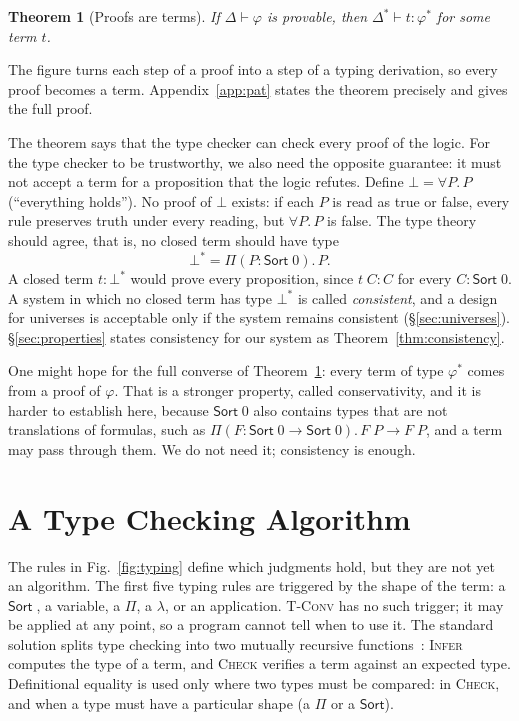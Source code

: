 \documentclass[acmsmall,screen,nonacm]{acmart}
\newtheorem{theorem}{Theorem}
\newcommand{\Sort}[1]{\mathsf{Sort}\;#1}
\newcommand{\tPi}[3]{\Pi(#1{:}#2).\,#3}
\begin{document}
\begin{theorem}[Proofs are terms]
\label{thm:pat}
If $\Delta \vdash \varphi$ is provable, then $\Delta^\ast \vdash t : \varphi^\ast$ for some term $t$.
\end{theorem}

\noindent The figure turns each step of a proof into a step of a typing derivation, so every proof becomes a term.
Appendix~\ref{app:pat} states the theorem precisely and gives the full proof.

The theorem says that the type checker can check every proof of the logic.
For the type checker to be trustworthy, we also need the opposite guarantee: it must not accept a term for a proposition that the logic refutes.
Define $\bot = \forall P.\,P$ (``everything holds'').
No proof of $\bot$ exists: if each $P$ is read as true or false, every rule preserves truth under every reading, but $\forall P.\,P$ is false.
The type theory should agree, that is, no closed term should have type
\[
\bot^\ast = \tPi{P}{\Sort{0}}{P}.
\]
A closed term $t : \bot^\ast$ would prove every proposition, since $t\;C : C$ for every $C : \Sort{0}$.
A system in which no closed term has type $\bot^\ast$ is called \emph{consistent}, and a design for universes is acceptable only if the system remains consistent (\S\ref{sec:universes}).
\S\ref{sec:properties} states consistency for our system as Theorem~\ref{thm:consistency}.

One might hope for the full converse of Theorem~\ref{thm:pat}: every term of type $\varphi^\ast$ comes from a proof of $\varphi$.
That is a stronger property, called conservativity, and it is harder to establish here,
because $\Sort{0}$ also contains types that are not translations of formulas, such as $\tPi{F}{\Sort{0} \to \Sort{0}}{F\;P \to F\;P}$, and a term may pass through them.
We do not need it; consistency is enough.

\section{A Type Checking Algorithm}
\label{sec:algorithm}

The rules in Fig.~\ref{fig:typing} define which judgments hold, but they are not yet an algorithm.
The first five typing rules are triggered by the shape of the term: a $\Sort{}$, a variable, a $\Pi$, a $\lambda$, or an application.
\textsc{T-Conv} has no such trigger; it may be applied at any point, so a program cannot tell when to use it.
The standard solution splits type checking into two mutually recursive functions~\cite{barendregt1992lambda}:
\textsc{Infer} computes the type of a term, and \textsc{Check} verifies a term against an expected type.
Definitional equality is used only where two types must be compared: in \textsc{Check}, and when a type must have a particular shape (a $\Pi$ or a $\mathsf{Sort}$).
\end{document}

